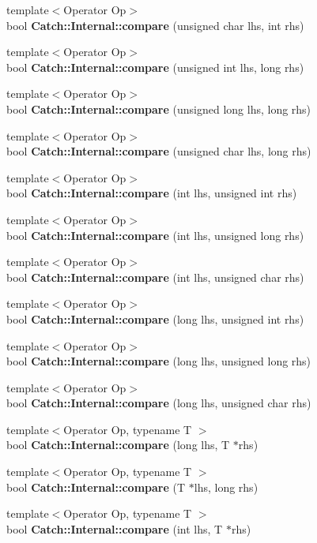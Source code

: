 \begin{DoxyCompactItemize}
{\footnotesize template$<$Operator Op$>$ }\\bool \textbf{ Catch\+::\+Internal\+::compare} (unsigned char lhs, int rhs)
\item 
{\footnotesize template$<$Operator Op$>$ }\\bool \textbf{ Catch\+::\+Internal\+::compare} (unsigned int lhs, long rhs)
\item 
{\footnotesize template$<$Operator Op$>$ }\\bool \textbf{ Catch\+::\+Internal\+::compare} (unsigned long lhs, long rhs)
\item 
{\footnotesize template$<$Operator Op$>$ }\\bool \textbf{ Catch\+::\+Internal\+::compare} (unsigned char lhs, long rhs)
\item 
{\footnotesize template$<$Operator Op$>$ }\\bool \textbf{ Catch\+::\+Internal\+::compare} (int lhs, unsigned int rhs)
\item 
{\footnotesize template$<$Operator Op$>$ }\\bool \textbf{ Catch\+::\+Internal\+::compare} (int lhs, unsigned long rhs)
\item 
{\footnotesize template$<$Operator Op$>$ }\\bool \textbf{ Catch\+::\+Internal\+::compare} (int lhs, unsigned char rhs)
\item 
{\footnotesize template$<$Operator Op$>$ }\\bool \textbf{ Catch\+::\+Internal\+::compare} (long lhs, unsigned int rhs)
\item 
{\footnotesize template$<$Operator Op$>$ }\\bool \textbf{ Catch\+::\+Internal\+::compare} (long lhs, unsigned long rhs)
\item 
{\footnotesize template$<$Operator Op$>$ }\\bool \textbf{ Catch\+::\+Internal\+::compare} (long lhs, unsigned char rhs)
\item 
{\footnotesize template$<$Operator Op, typename T $>$ }\\bool \textbf{ Catch\+::\+Internal\+::compare} (long lhs, T $\ast$rhs)
\item 
{\footnotesize template$<$Operator Op, typename T $>$ }\\bool \textbf{ Catch\+::\+Internal\+::compare} (T $\ast$lhs, long rhs)
\item 
{\footnotesize template$<$Operator Op, typename T $>$ }\\bool \textbf{ Catch\+::\+Internal\+::compare} (int lhs, T $\ast$rhs)

\end{DoxyCompactItemize}
